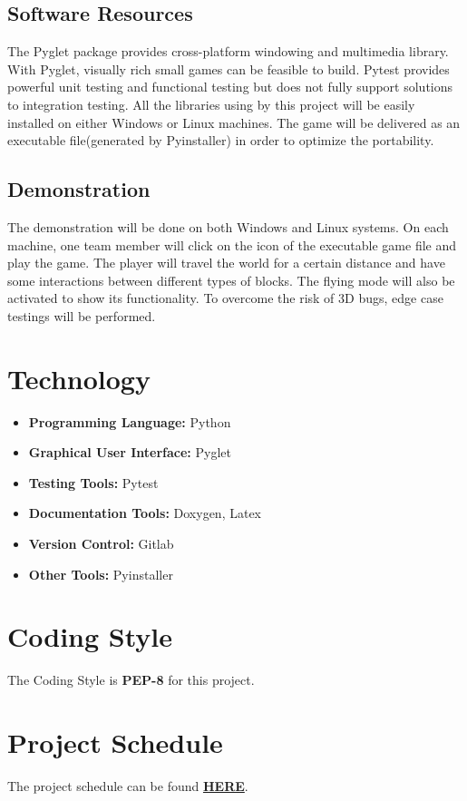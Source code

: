 \documentclass{article}
\begin{document}
\subsection{Software Resources}
The Pyglet package provides cross-platform windowing and multimedia library. With Pyglet, visually rich small games can be feasible to build. Pytest provides powerful unit testing and functional testing but does not fully support solutions to integration testing. All the libraries using by this project will be easily installed on either Windows or Linux machines. The game will be delivered as an executable file(generated by Pyinstaller) in order to optimize the portability.
\subsection{Demonstration}
The demonstration will be done on both Windows and Linux systems. On each machine, one team member will click on the icon of the executable game file and play the game. The player will travel the world for a certain distance and have some interactions between different types of blocks. The flying mode will also be activated to show its functionality. To overcome the risk of 3D bugs, edge case testings will be performed.

\section{Technology}
\begin{itemize}
	\item \textbf{Programming Language: }Python
	\item \textbf{Graphical User Interface: }Pyglet
	\item \textbf{Testing Tools: }Pytest
	\item \textbf{Documentation Tools: }Doxygen, Latex
	\item \textbf{Version Control: }Gitlab
	\item \textbf{Other Tools: }Pyinstaller
\end{itemize}

\section{Coding Style}
The Coding Style is \textbf{PEP-8} for this project.
\section{Project Schedule}
The project schedule can be found \href{https://gitlab.cas.mcmaster.ca/wangs132/minecraft/-/blob/master/ProjectSchedule/ProjectSchedule_3XA3_307.pdf}{\textbf{HERE}}.
\end{document}
